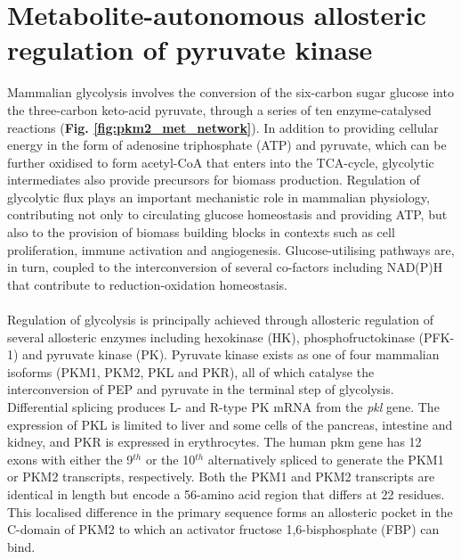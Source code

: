 \section{Metabolite-autonomous allosteric regulation of pyruvate kinase}
Mammalian glycolysis involves the conversion of the six-carbon sugar glucose into the three-carbon keto-acid pyruvate, through a series of ten enzyme-catalysed reactions (\textbf{Fig. \ref{fig:pkm2_met_network}}). In addition to providing cellular energy in the form of adenosine triphosphate (ATP) and pyruvate, which can be further oxidised to form acetyl-CoA that enters into the TCA-cycle, glycolytic intermediates also provide precursors for biomass production. Regulation of glycolytic flux plays an important mechanistic role in mammalian physiology, contributing not only to circulating glucose homeostasis and providing ATP, but also to the provision of biomass building blocks in contexts such as cell proliferation, immune activation and angiogenesis. Glucose-utilising pathways are, in turn, coupled to the interconversion of several co-factors including NAD(P)H that contribute to reduction-oxidation homeostasis.
%
%
\\\\
%
%
Regulation of glycolysis is principally achieved through allosteric regulation of several allosteric enzymes including hexokinase (HK), phosphofructokinase (PFK-1) and pyruvate kinase (PK). Pyruvate kinase exists as one of four mammalian isoforms (PKM1, PKM2, PKL and PKR), all of which catalyse the interconversion of PEP and pyruvate in the terminal step of glycolysis. Differential splicing produces L- and R-type PK mRNA from the \textit{pkl} gene. The expression of PKL is limited to liver and some cells of the pancreas, intestine and kidney, and PKR is expressed in erythrocytes. The human pkm gene has 12 exons with either the 9$^{th}$ or the 10$^{th}$ alternatively spliced to generate the PKM1 or PKM2 transcripts, respectively. Both the PKM1 and PKM2 transcripts are identical in length but encode a 56-amino acid region that differs at 22 residues. This localised difference in the primary sequence forms an allosteric pocket in the C-domain of PKM2 to which an activator fructose 1,6-bisphosphate (FBP) can bind.
%
%
\\\\
%
%
